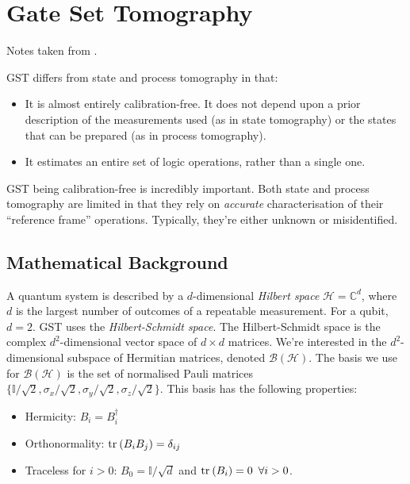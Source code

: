 \section{Gate Set Tomography}

Notes taken from \cite{nielsen_gate_2020}.

\noindent \ac{GST} differs from state and process tomography in that:
\begin{itemize}
    \item It is almost entirely calibration-free. It does not depend upon a prior description of the
    measurements used (as in state tomography) or the states that can be prepared (as in process
    tomography).
    \item It estimates an entire set of logic operations, rather than a single one.
\end{itemize}

\ac{GST} being calibration-free is incredibly important. Both state and process tomography are
limited in that they rely on \textit{accurate} characterisation of their ``reference frame''
operations. Typically, they're either unknown or misidentified.

\subsection{Mathematical Background}


A quantum system is described by a $d$-dimensional \textit{Hilbert space} $\mathcal{H} =
\mathbb{C}^d$, where $d$ is the largest number of outcomes of a repeatable measurement. For a qubit,
$d = 2$. GST uses the \textit{Hilbert-Schmidt space}. The Hilbert-Schmidt space is the complex
$d^2$-dimensional vector space of $d \times d$ matrices. We're interested in the $d^2$-dimensional
subspace of Hermitian matrices, denoted $\mathcal{B(H)}$. The basis we use for $\mathcal{B(H)}$ is
the set of normalised Pauli matrices $\{ \mathbb{I} / \sqrt{2}, \sigma_x / \sqrt{2}, \sigma_y /
\sqrt{2}, \sigma_z / \sqrt{2} \}$. This basis has the following properties:
\begin{itemize}
    \item Hermicity: $B_i = B_i^{\dagger}$
    \item Orthonormality: $\text{tr}_{}\left(B_i B_j\right) = \delta_{ij}$
    \item Traceless for $i > 0$: $B_0 = \mathbb{I} / \sqrt{d}$ and $\text{tr}_{}\left(B_i\right) = 0 \enspace \forall{i}
    > 0$.
\end{itemize}

